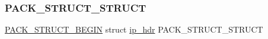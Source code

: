 \subsubsection{\texorpdfstring{P\+A\+C\+K\+\_\+\+S\+T\+R\+U\+C\+T\+\_\+\+S\+T\+R\+U\+CT}{PACK\_STRUCT\_STRUCT}}
{\footnotesize\ttfamily \hyperlink{group__compiler__abstraction_ga73199061891adf1b912d20835c7d5e96}{P\+A\+C\+K\+\_\+\+S\+T\+R\+U\+C\+T\+\_\+\+B\+E\+G\+IN} struct \hyperlink{structip__hdr}{ip\+\_\+hdr}  P\+A\+C\+K\+\_\+\+S\+T\+R\+U\+C\+T\+\_\+\+S\+T\+R\+U\+CT}

